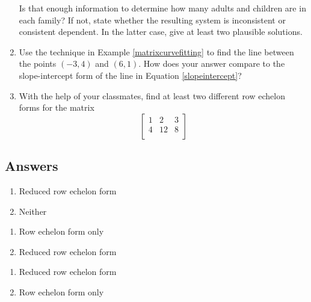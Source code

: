 \begin{enumerate}
\smallskip

Is that enough information to determine how many adults and children are in each family?  If not, state whether the resulting system is inconsistent or consistent dependent.  In the latter case, give at least two plausible solutions.  

\item Use the technique in Example \ref{matrixcurvefitting} to find the line between the points $(-3, 4)$ and $(6, 1)$. How does your answer compare to the slope-intercept form of the line in Equation \ref{slopeintercept}?

\item With the help of your classmates, find at least two different row echelon forms for the matrix \[\left[ \begin{array}{rr|r} 
1 & 2 & 3 \\ 
4 & 12 & 8  \\ 
\end{array} \right]\]

\end{enumerate}

\newpage

\subsection{Answers}

\begin{multicols}{2}
\begin{enumerate}

\item Reduced row echelon form
\item Neither

\setcounter{HW}{\value{enumi}}
\end{enumerate}
\end{multicols}


\begin{multicols}{2}
\begin{enumerate}
\setcounter{enumi}{\value{HW}}



\item Row echelon form only
\item Reduced row echelon form

\setcounter{HW}{\value{enumi}}
\end{enumerate}
\end{multicols}


\begin{multicols}{2}
\begin{enumerate}
\setcounter{enumi}{\value{HW}}

\item Reduced row echelon form
\item Row echelon form only

\setcounter{HW}{\value{enumi}}
\end{enumerate}
\end{multicols}

